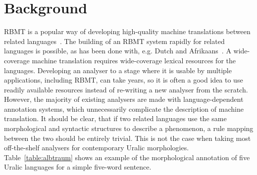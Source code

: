 \documentclass[free]{flammie}
\begin{document}
\section{Background}
\label{sec:background}

RBMT is a popular way of developing high-quality machine translations between related languages~\cite{apertium}.
The building of an RBMT system rapidly for related languages is possible, as has been done with, e.g. Dutch and Afrikaans~\cite{otte11}.
A wide-coverage machine translation requires wide-coverage lexical resources for the languages.
Developing an analyser to a stage where it is usable by multiple applications, including RBMT, can take years, so it is often a good idea to use readily available resources instead of re-writing a new analyser from the  scratch.
However, the majority of existing analysers are made with language-dependent annotation systems, which unnecessarily complicate the description of machine translation.
It should be clear, that if two related languages use the same morphological and syntactic structures to describe a phenomenon, a rule mapping between the two should be entirely trivial.
This is not the case when taking most off-the-shelf analysers for contemporary Uralic morphologies. Table~\ref{table:albtraum} shows an example of the morphological annotation of five Uralic languages for a simple five-word sentence.
\end{document}
